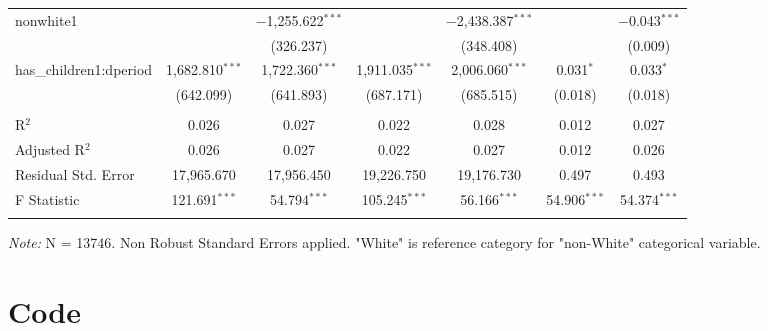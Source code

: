 \documentclass[a4paper]{article}
\begin{document}
\begin{table}[!htbp]
\begin{adjustwidth}{0.cm}{-0cm}
\begin{threeparttable}
\begin{tabular}{@{\extracolsep{-2pt}}lcccccc}
  nonwhite1 &  & $-$1,255.622$^{***}$ &  & $-$2,438.387$^{***}$ &  & $-$0.043$^{***}$ \\ 
  &  & (326.237) &  & (348.408) &  & (0.009) \\ 
  has\_children1:dperiod & 1,682.810$^{***}$ & 1,722.360$^{***}$ & 1,911.035$^{***}$ & 2,006.060$^{***}$ & 0.031$^{*}$ & 0.033$^{*}$ \\ 
  & (642.099) & (641.893) & (687.171) & (685.515) & (0.018) & (0.018) \\ 
 \hline \\[-1.8ex] 
R$^{2}$ & 0.026 & 0.027 & 0.022 & 0.028 & 0.012 & 0.027 \\ 
Adjusted R$^{2}$ & 0.026 & 0.027 & 0.022 & 0.027 & 0.012 & 0.026 \\ 
Residual Std. Error & 17,965.670 & 17,956.450  & 19,226.750  & 19,176.730 & 0.497  & 0.493  \\ 
F Statistic & 121.691$^{***}$ & 54.794$^{***}$ & 105.245$^{***}$ & 56.166$^{***}$  & 54.906$^{***}$  & 54.374$^{***}$  \\ 
\hline 
\hline \\[-3.5ex] 
\end{tabular} 
\begin{tablenotes}
      \small
      \item\textit{Note:} N = 13746. Non Robust Standard Errors applied. "White" is reference category for "non-White" categorical variable.
    \end{tablenotes}
\end{threeparttable}
\end{adjustwidth}
%
\end{table}

\section{Code}
\end{document}

